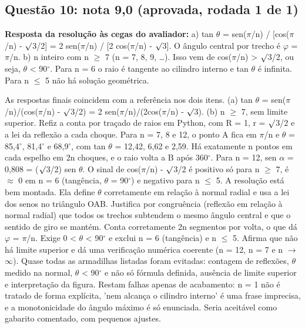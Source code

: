 \documentclass{article}%
\begin{document}
\subsection*{Questão 10: nota 9,0 (aprovada, rodada 1 de 1)}%
\textbf{Resposta da resolução às cegas do avaliador:} a) tan $\theta$ = sen($\pi$/n) / {[}cos($\pi$/n) - $\surd$3/2{]} = 2 sen($\pi$/n) / {[}2 cos($\pi$/n) - $\surd$3{]}. O ângulo central por trecho é $\varphi$ = $\pi$/n.\newline%
\newline%
b) n inteiro com n $\geq$ 7 (n = 7, 8, 9, \ldots{}). Isso vem de cos($\pi$/n) > $\surd$3/2, ou seja, $\theta$ < 90$^\circ$. Para n = 6 o raio é tangente ao cilindro interno e tan $\theta$ é infinita. Para n $\leq$ 5 não há solução geométrica.\par %
As respostas finais coincidem com a referência nos dois itens. (a) tan $\theta$ = sen($\pi$/n)/(cos($\pi$/n) - $\surd$3/2) = 2 sen($\pi$/n)/(2cos($\pi$/n) - $\surd$3). (b) n $\geq$ 7, sem limite superior. Refiz a conta por traçado de raios em Python, com R = 1, r = $\surd$3/2 e a lei da reflexão a cada choque. Para n = 7, 8 e 12, o ponto A fica em $\pi$/n e $\theta$ = 85,4$^\circ$, 81,4$^\circ$ e 68,9$^\circ$, com tan $\theta$ = 12,42, 6,62 e 2,59. Há exatamente n pontos em cada espelho em 2n choques, e o raio volta a B após 360$^\circ$. Para n = 12, sen $\alpha$ = 0,808 = ($\surd$3/2) sen $\theta$. O sinal de cos($\pi$/n) - $\surd$3/2 é positivo só para n $\geq$ 7, é $\approx$ 0 em n = 6 (tangência, $\theta$ = 90$^\circ$) e negativo para n $\leq$ 5. A resolução está bem montada. Ela define $\theta$ corretamente em relação à normal radial e usa a lei dos senos no triângulo OAB. Justifica por congruência (reflexão em relação à normal radial) que todos os trechos subtendem o mesmo ângulo central e que o sentido de giro se mantém. Conta corretamente 2n segmentos por volta, o que dá $\varphi$ = $\pi$/n. Exige 0 < $\theta$ < 90$^\circ$ e exclui n = 6 (tangência) e n $\leq$ 5. Afirma que não há limite superior e dá uma verificação numérica coerente (n = 12, n = 7 e n $\to$ $\infty$). Quase todas as armadilhas listadas foram evitadas: contagem de reflexões, $\theta$ medido na normal, $\theta$ < 90$^\circ$ e não só fórmula definida, ausência de limite superior e interpretação da figura. Restam falhas apenas de acabamento: n = 1 não é tratado de forma explícita, 'nem alcança o cilindro interno' é uma frase imprecisa, e a monotonicidade do ângulo máximo é só enunciada. Seria aceitável como gabarito comentado, com pequenos ajustes.%
\end{document}
